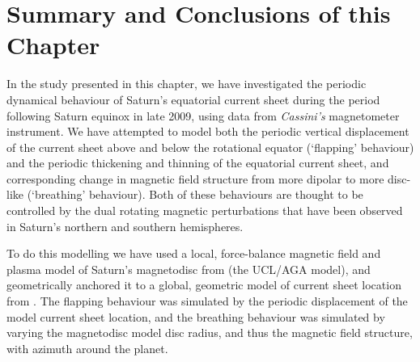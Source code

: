 \section{Summary and Conclusions of this Chapter}\label{equinox:sec:conclusions}
In the study presented in this chapter, we have investigated the periodic dynamical behaviour of Saturn's equatorial current sheet during the period following Saturn equinox in late 2009, using data from \textit{Cassini's} magnetometer instrument. We have attempted to model both the periodic vertical displacement of the current sheet above and below the rotational equator (`flapping' behaviour) and the periodic thickening and thinning of the equatorial current sheet, and corresponding change in magnetic field structure from more dipolar to more disc-like (`breathing' behaviour). Both of these behaviours are thought to be controlled by the dual rotating magnetic perturbations that have been observed in Saturn's northern and southern hemispheres.

To do this modelling we have used a local, force-balance magnetic field and plasma model of Saturn's magnetodisc from \citet{achilleos2010a} (the UCL/AGA model), and geometrically anchored it to a global, geometric model of current sheet location from \citet{arridge2011}. The flapping behaviour was simulated by the periodic displacement of the model current sheet location, and the breathing behaviour was simulated by varying the magnetodisc model disc radius, and thus the magnetic field structure, with azimuth around the planet.


